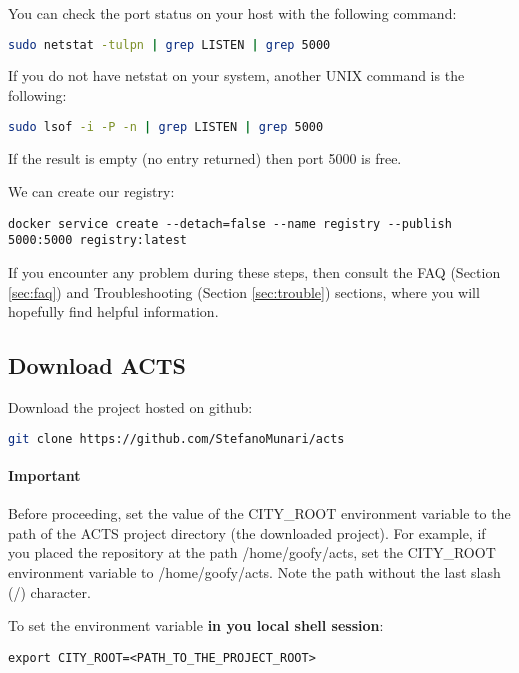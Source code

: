 You can check the port status on your host with the following command:

\begin{lstlisting}[language=bash]
sudo netstat -tulpn | grep LISTEN | grep 5000
\end{lstlisting}

If you do not have netstat on your system, another UNIX command is the
following:

\begin{lstlisting}[language=bash]
sudo lsof -i -P -n | grep LISTEN | grep 5000
\end{lstlisting}

If the result is empty (no entry returned) then port 5000 is free.

We can create our registry:

\begin{lstlisting}
docker service create --detach=false --name registry --publish 5000:5000 registry:latest
\end{lstlisting}

If you encounter any problem during these steps, then
consult the FAQ (Section \ref{sec:faq}) and
Troubleshooting (Section \ref{sec:trouble})
sections, where you will hopefully find
helpful information.


\subsection{Download ACTS}

Download the project hosted on github:

\begin{lstlisting}[language=bash]
git clone https://github.com/StefanoMunari/acts
\end{lstlisting}

\paragraph{Important}
Before proceeding, set the value
of the CITY\_ROOT environment variable to the path of the ACTS project
directory (the downloaded project).
For example, if you placed the repository at the path
/home/goofy/acts, set the CITY\_ROOT environment variable to
/home/goofy/acts. Note the path without the last slash (/)
character.

To set the environment variable \textbf{in you local shell session}:
\begin{lstlisting}
export CITY_ROOT=<PATH_TO_THE_PROJECT_ROOT>
\end{lstlisting}

